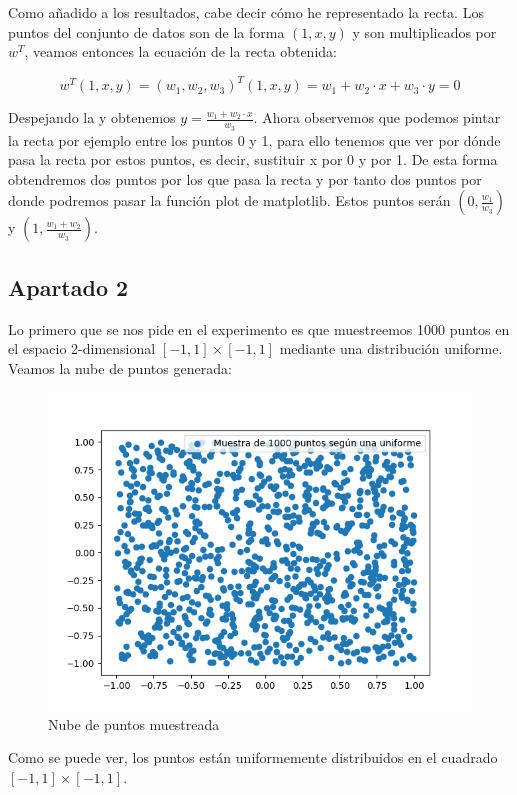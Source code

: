 \documentclass[12pt,a4paper]{article}
\begin{document}
Como añadido a los resultados, cabe decir cómo he representado la recta. Los puntos del conjunto de datos son de la forma $(1,x,y)$ y son multiplicados por $w^T$, veamos entonces la ecuación de la recta obtenida:

$$w^T(1,x,y) = (w_1,w_2,w_3)^T(1,x,y) = w_1 + w_2\cdot x + w_3\cdot y = 0$$

Despejando la y obtenemos $y = \frac{w_1 + w_2\cdot x}{w_3}$. Ahora observemos que podemos pintar la recta por ejemplo entre los puntos 0 y 1, para ello tenemos que ver por dónde pasa la recta por estos puntos, es decir, sustituir x por 0 y por 1. De esta forma obtendremos dos puntos por los que pasa la recta y por tanto dos puntos por donde podremos pasar la función plot de matplotlib. Estos puntos serán $(0,\frac{w_1}{w_3})$ y $(1,\frac{w_1 + w_2}{w_3})$.

\subsection{Apartado 2}
Lo primero que se nos pide en el experimento es que muestreemos 1000 puntos en el espacio 2-dimensional $[-1,1]\times [-1,1]$ mediante una distribución uniforme. Veamos la nube de puntos generada:

\begin{figure}[H]
	\centering
	\includegraphics[scale=0.7]{./Imagenes/ej2-2-1.png}
	\caption{Nube de puntos muestreada}
	\label{ej2-2-1}
\end{figure}

Como se puede ver, los puntos están uniformemente distribuidos en el cuadrado $[-1,1]\times [-1,1]$.
\end{document}
